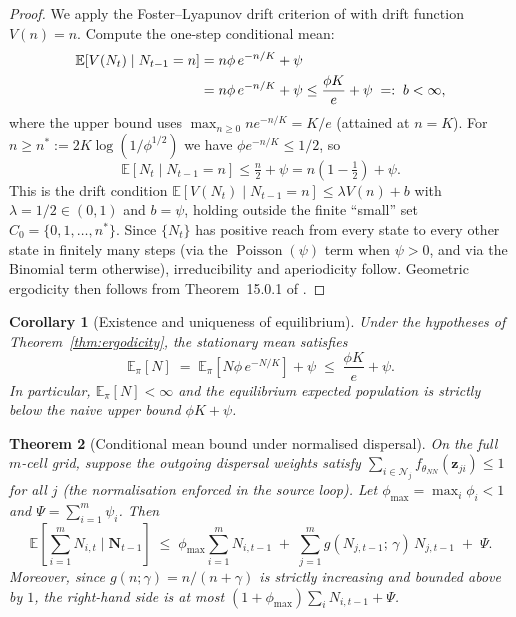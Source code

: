 \documentclass[12pt,a4paper]{article}
\newtheorem{theorem}{Theorem}
\newtheorem{corollary}[theorem]{Corollary}
\theoremstyle{definition}
\newcommand{\E}{\mathbb{E}}
\newcommand{\Pois}{\operatorname{Poisson}}
\newcommand{\bz}{\bm{z}}
\begin{document}
\begin{proof}
We apply the Foster--Lyapunov drift criterion of \citet{meyntweedie1993} with
drift function $V(n) = n$.  Compute the one-step conditional mean:
\begin{align}
  \E\!\left[V(N_t)\mid N_{t-1}=n\right]
  &= n\phi\,e^{-n/K} + \psi
  \notag\\
  &= n\phi\,e^{-n/K} + \psi
  \leq \frac{\phi K}{e} + \psi
  \;=:\; b < \infty,
  \label{eq:lyapunov}
\end{align}
where the upper bound uses $\max_{n\geq 0} n e^{-n/K} = K/e$ (attained at $n=K$).
For $n \geq n^* := 2K\log(1/\phi^{1/2})$ we have $\phi e^{-n/K} \leq 1/2$,
so
\[
  \E\!\left[N_t \mid N_{t-1}=n\right]
  \leq \tfrac{n}{2} + \psi
  = n\left(1-\tfrac{1}{2}\right) + \psi.
\]
This is the drift condition $\E[V(N_t)\mid N_{t-1}=n] \leq \lambda V(n) + b$
with $\lambda = 1/2 \in (0,1)$ and $b = \psi$, holding outside the finite
``small'' set $C_0 = \{0,1,\ldots,n^*\}$.
Since $\{N_t\}$ has positive reach from every state to every other state
in finitely many steps (via the $\Pois(\psi)$ term when $\psi > 0$, and via
the Binomial term otherwise), irreducibility and aperiodicity follow.
Geometric ergodicity then follows from Theorem~15.0.1 of \citet{meyntweedie1993}.
\end{proof}

\begin{corollary}[Existence and uniqueness of equilibrium]
\label{cor:equilibrium}
Under the hypotheses of Theorem~\ref{thm:ergodicity}, the stationary mean
satisfies
\[
  \E_\pi[N]
  \;=\; \E_\pi\!\left[N\phi\,e^{-N/K}\right] + \psi
  \;\leq\; \frac{\phi K}{e} + \psi.
\]
In particular, $\E_\pi[N] < \infty$ and the equilibrium expected population
is strictly below the naive upper bound $\phi K + \psi$.
\end{corollary}

\begin{theorem}[Conditional mean bound under normalised dispersal]
\label{thm:bound}
On the full $m$-cell grid, suppose the outgoing dispersal weights satisfy
$\sum_{i \in \mathcal{N}_j} f_{\theta_{NN}}(\bz_{ji}) \leq 1$ for all $j$
(the normalisation enforced in the source loop).  Let
$\phi_{\max} = \max_i \phi_i < 1$ and $\Psi = \sum_{i=1}^m \psi_i$.
Then
\begin{equation}
  \E\!\left[\sum_{i=1}^m N_{i,t} \;\Bigg|\; \mathbf{N}_{t-1}\right]
  \;\leq\;
  \phi_{\max}\sum_{i=1}^m N_{i,t-1}
  \;+\; \sum_{j=1}^m g(N_{j,t-1};\,\gamma)\,N_{j,t-1}
  \;+\; \Psi.
  \label{eq:total-bound}
\end{equation}
Moreover, since $g(n;\gamma) = n/(n+\gamma)$ is strictly increasing and bounded
above by $1$, the right-hand side is at most
$(1 + \phi_{\max})\sum_i N_{i,t-1} + \Psi$.
\end{theorem}
\end{document}
